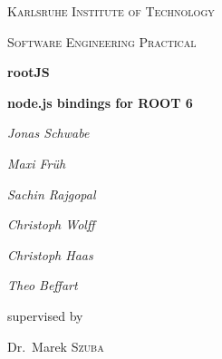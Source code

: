 
\begin{titlepage}
	\centering
	{\scshape\LARGE Karlsruhe Institute of Technology \par}
	\vspace{1cm}
	{\scshape\Large Software Engineering Practical\par}
	\vspace{1.5cm}
	{\Huge\bfseries rootJS\par}
	\vspace{0.25cm}
	{\Large\bfseries node.js bindings for ROOT 6\par}
	\vspace{2cm}
	{\Large\itshape Jonas Schwabe\par}
	{\Large\itshape Maxi Fr\"uh\par}
	{\Large\itshape Sachin Rajgopal\par}
	{\Large\itshape Christoph Wolff\par}
	{\Large\itshape Christoph Haas\par}
	{\Large\itshape Theo Beffart\par}
	\vfill
	supervised by\par
	Dr.~Marek \textsc{Szuba}
	
	\vfill
	
	{\large \date{30.11.2015}\par}
\end{titlepage}
